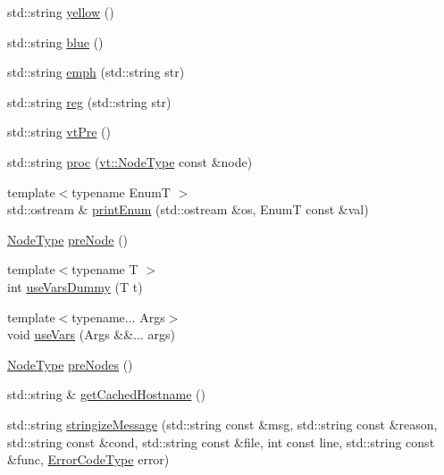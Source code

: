 \begin{DoxyCompactItemize}
std\+::string \hyperlink{namespacevt_1_1debug_ad85c9e5ee0f986151a01212647d2b60d}{yellow} ()
\item 
std\+::string \hyperlink{namespacevt_1_1debug_a26b73aa7586b78f4c148b26e5414ebe1}{blue} ()
\item 
std\+::string \hyperlink{namespacevt_1_1debug_add365336d7aa2053b5b7588ccad48ac7}{emph} (std\+::string str)
\item 
std\+::string \hyperlink{namespacevt_1_1debug_a394711b7d26f45a51bf46c86032742f1}{reg} (std\+::string str)
\item 
std\+::string \hyperlink{namespacevt_1_1debug_acfaac527e91984bde40775eb9b4372ef}{vt\+Pre} ()
\item 
std\+::string \hyperlink{namespacevt_1_1debug_a13a11e278ff8e5a4093396437511aeb7}{proc} (\hyperlink{namespacevt_a866da9d0efc19c0a1ce79e9e492f47e2}{vt\+::\+Node\+Type} const \&node)
\item 
{\footnotesize template$<$typename EnumT $>$ }\\std\+::ostream \& \hyperlink{namespacevt_1_1debug_afaa2c8383e718071689dfea2c959a467}{print\+Enum} (std\+::ostream \&os, EnumT const \&val)
\item 
\hyperlink{namespacevt_a866da9d0efc19c0a1ce79e9e492f47e2}{Node\+Type} \hyperlink{namespacevt_1_1debug_a0f9acc324c2b3308760aa13b29dd9736}{pre\+Node} ()
\item 
{\footnotesize template$<$typename T $>$ }\\int \hyperlink{namespacevt_1_1debug_a4417ee390fd826c2135e06abe59719dd}{use\+Vars\+Dummy} (T t)
\item 
{\footnotesize template$<$typename... Args$>$ }\\void \hyperlink{namespacevt_1_1debug_aeff93f73b5ac173a53dcf778ff771c2e}{use\+Vars} (Args \&\&... args)
\item 
\hyperlink{namespacevt_a866da9d0efc19c0a1ce79e9e492f47e2}{Node\+Type} \hyperlink{namespacevt_1_1debug_ab9a204b679ea705a255d3cb4dcce02f3}{pre\+Nodes} ()
\item 
std\+::string \& \hyperlink{namespacevt_1_1debug_a24ece85f97b2cbc60968d3cf21b36be6}{get\+Cached\+Hostname} ()
\item 
std\+::string \hyperlink{namespacevt_1_1debug_a63b47ef166cce2fe27d4fbc366a2e23c}{stringize\+Message} (std\+::string const \&msg, std\+::string const \&reason, std\+::string const \&cond, std\+::string const \&file, int const line, std\+::string const \&func, \hyperlink{namespacevt_a793764d753923abc3d32929870beb485}{Error\+Code\+Type} error)
\end{DoxyCompactItemize}


